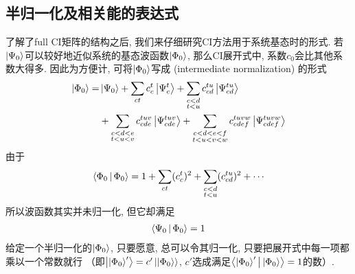 \subsection{半归一化及相关能的表达式}
了解了full CI矩阵的结构之后, 我们来仔细研究CI方法用于系统基态时的形式. 若$\Ket{\Psi_0}$可以较好地近似系统的基态波函数$\Ket{\Phi_0}$, 那么CI展开式中, 系数$c_0$会比其他系数大得多. 因此为方便计, 可将$\Ket{\Phi_0}$写成\emph{} (intermediate normalization) 的形式
\begin{align}
\label{4.4}
\Ket{\Phi_0} =& \Ket{\Psi_0} + \sum_{ct}c_c^t\Ket{\Psi_c^t} + \sum_{\substack{c<d\\t<u}} c_{cd}^{tu}\Ket{\Psi_{cd}^{tu}}\notag\\
&+\sum_{\substack{c<d<e\\t<u<v}} c_{cde}^{tuv}\Ket{\Psi_{cde}^{tuv}} +\sum_{\substack{c<d<e<f\\t<u<v<w}} c_{cdef}^{tuvw}\Ket{\Psi_{cdef}^{tuvw}}
\end{align}
由于
\begin{align}
\Braket{\Phi_0|\Phi_0} = 1 + \sum_{ct}(c_c^t)^2 + \sum_{\substack{c<d\\t<u}} (c_{cd}^{tu})^2 + \cdots \notag
\end{align}
所以波函数其实并未归一化, 但它却满足
\begin{align}
\Braket{\Psi_0|\Phi_0} =1
\end{align}
给定一个半归一化的$\Ket{\Phi_0}$, 只要愿意, 总可以令其归一化, 只要把展开式中每一项都乘以一个常数就行 （即$\Ket{\Ket{\Phi_0}'}=c'\Ket{\Ket{\Phi_0}}$, $c'$选成满足$\Braket{\Ket{\Phi_0}'|\Ket{\Phi_0}}=1$的数）.

\makeatletter
\HyRef@currentHtag
\makeatother


